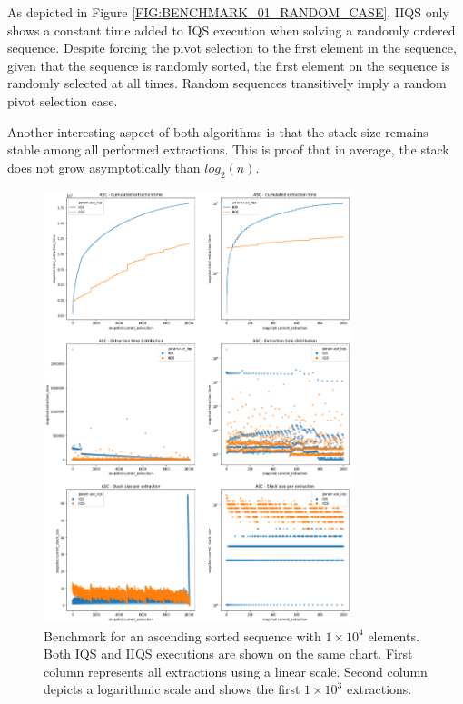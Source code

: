 As depicted in Figure \ref{FIG:BENCHMARK_01_RANDOM_CASE}, IIQS only shows a constant time added to IQS execution when solving a randomly ordered sequence. Despite forcing the pivot selection to the first element in the sequence, given that the sequence is randomly sorted, the first element on the sequence is randomly selected at all times. Random sequences transitively imply a random pivot selection case.

Another interesting aspect of both algorithms is that the stack size remains stable among all performed extractions. This is proof that in average, the stack does not grow asymptotically than $log_2(n)$.


\begin{figure}[!ht]
    \centering
    \includegraphics[width=0.8\textwidth]{./fragments/04_experimental_execution/images/01_basebenchmark_02_sort_a_case.png}
    \caption{Benchmark for an ascending sorted sequence with $1\times10^4$ elements. Both IQS and IIQS executions are shown on the same chart. First column represents all extractions using a linear scale. Second column depicts a logarithmic scale and shows the first $1\times10^3$ extractions.}
    \label{FIG:BENCHMARK_02_ASC_CASE}
\end{figure}


